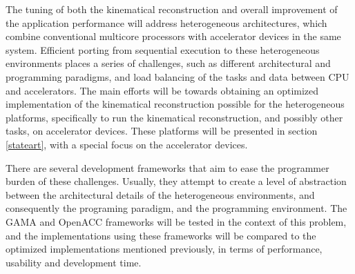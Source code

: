 The tuning of both the kinematical reconstruction and overall improvement of the application performance will address heterogeneous architectures, which combine conventional multicore processors with accelerator devices in the same system. Efficient porting from sequential execution to these heterogeneous environments places a series of challenges, such as different architectural and programming paradigms, and load balancing of the tasks and data between CPU and accelerators. The main efforts will be towards obtaining an optimized implementation of the kinematical reconstruction possible for the heterogeneous platforms, specifically to run the kinematical reconstruction, and possibly other tasks, on accelerator devices. These platforms will be presented in section \ref{stateart}, with a special focus on the accelerator devices.

There are several development frameworks that aim to ease the programmer burden of these challenges. Usually, they attempt to create a level of abstraction between the architectural details of the heterogeneous environments, and consequently the programing paradigm, and the programming environment. The GAMA and OpenACC frameworks will be tested in the context of this problem, and the implementations using these frameworks will be compared to the optimized implementations mentioned previously, in terms of performance, usability and development time.

\newpage
